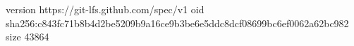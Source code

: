 version https://git-lfs.github.com/spec/v1
oid sha256:c843fc71b8b4d2be5209b9a16ce9b3be6e5ddc8dcf08699bc6ef0062a62bc982
size 43864
